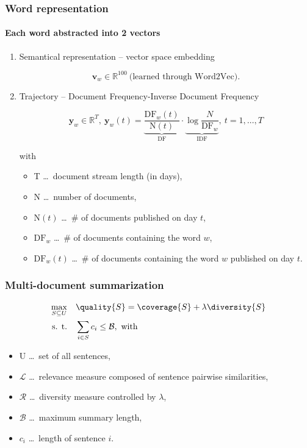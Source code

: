 \documentclass{beamer}
\newcommand{\budget}{\mathcal{B}}
\newcommand{\sentcost}{c}
\begin{document}
\begin{frame}[noframenumbering]
\frametitle{Word representation}
\framesubtitle{Each word abstracted into 2 vectors}

\begin{enumerate}
\item Semantical representation -- vector space embedding

\begin{equation}
\mathbf{v}_{w} \in \mathbb{R}^{100}\ \text{(learned through Word2Vec).}
\end{equation}

\item Trajectory -- Document Frequency-Inverse Document Frequency

\begin{equation}
\mathbf{y}_{w} \in \mathbb{R}^{T},~\mathbf{y}_{w}(t) = \underbrace{\frac{\text{DF}_{w}(t)}{\text{N}(t)}}_{\text{DF}} \cdot \underbrace{\log{\frac{N}{\text{DF}_{w}}}}_{\text{IDF}},\ t = 1, \dots, T
\end{equation}

with

\begin{itemize}
\item T \dots~document stream length (in days),
\item N \dots~number of documents,
\item $\text{N}(t)$ \dots~\# of documents published on day $t$,
\item $\text{DF}_{w}$ \dots~\# of documents containing the word $w$,
\item $\text{DF}_{w}(t)$ \dots~\# of documents containing the word $w$ published on day $t$.
\end{itemize}

\end{enumerate}

\end{frame}


\begin{frame}[noframenumbering]
\frametitle{Multi-document summarization}
\begin{equation}
\begin{alignedat}{-1}
\max_{S \subseteq U} & \quad \quality{S} = \coverage{S} + \lambda \diversity{S} \\
\text{s. t.} & \quad \sum_{i \in S}{\sentcost_{i}} \leq \budget,~\text{with}
\end{alignedat}
\end{equation}

\begin{itemize}
\item U \dots~set of all sentences,
\item $\mathcal{L}$ \dots~relevance measure composed of sentence pairwise similarities,
\item $\mathcal{R}$ \dots~diversity measure controlled by $\lambda$,
\item $\mathcal{B}$ \dots~maximum summary length,
\item $c_{i}$ \dots~length of sentence $i$.
\end{itemize}

\end{frame}
\end{document}
